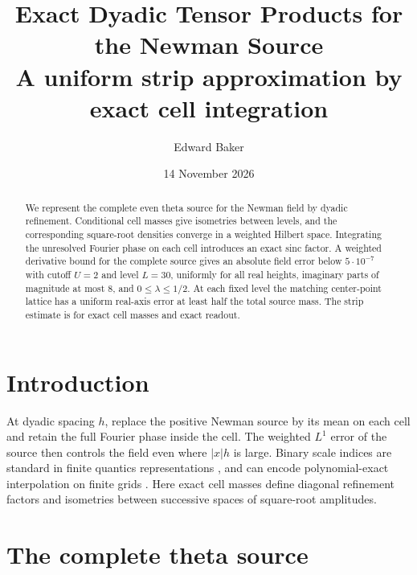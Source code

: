 \documentclass[11pt]{article}
\title{Exact Dyadic Tensor Products for the Newman Source\\
\large A uniform strip approximation by exact cell integration}
\author{Edward Baker}
\date{14 November 2026}
\begin{document}
\maketitle

\begin{abstract}
We represent the complete even theta source for the Newman field by
dyadic refinement. Conditional cell masses give isometries between
levels, and the corresponding square-root densities converge in a
weighted Hilbert space. Integrating the unresolved Fourier phase on
each cell introduces an exact sinc factor. A weighted derivative bound
for the complete source gives an absolute field error below
\(5\cdot10^{-7}\) with cutoff \(U=2\) and level \(L=30\), uniformly for
all real heights, imaginary parts of magnitude at most \(8\), and
\(0\le\lambda\le1/2\). At each fixed level the matching center-point
lattice has a uniform real-axis error at least half the total source
mass. The strip estimate is for exact cell masses and exact readout.
\end{abstract}

\section{Introduction}

At dyadic spacing \(h\), replace the positive Newman source by its
mean on each cell and retain the full Fourier phase inside the cell.
The weighted \(L^1\) error of the source then controls the field
even where \(|x|h\) is large. Binary scale indices are standard in
finite quantics representations \cite[\S II.1, (1)]{Shinaoka}, and
can encode polynomial-exact interpolation on finite grids
\cite[\S 4.1, Proposition 13]{Lindsey}. Here exact cell masses define
diagonal refinement factors and isometries between successive spaces
of square-root amplitudes.

\section{The complete theta source}\label{sec:source}
\end{document}
